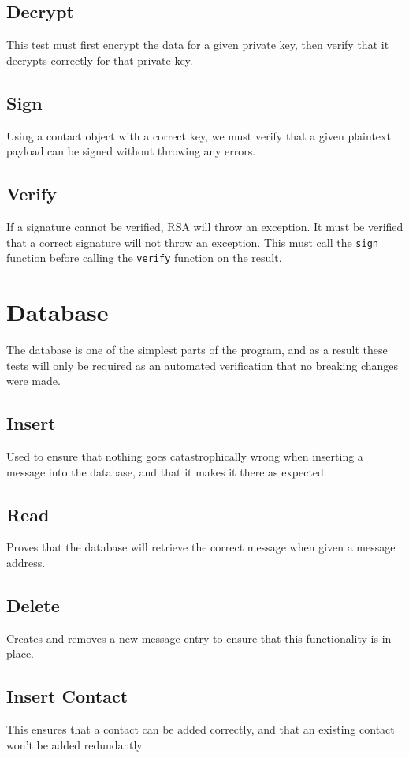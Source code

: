 \documentclass[titlepage]{report}
\begin{document}
\subsection{Decrypt}
This test must first encrypt the data for a given \gls{private key}, then verify that it decrypts correctly for that \gls{private key}.
\subsection{Sign}
Using a contact object with a correct key, we must verify that a given plaintext payload can be signed without throwing any errors.
\subsection{Verify}
If a signature cannot be verified, RSA will throw an exception. It must be verified that a correct signature will not throw an exception. This must call the \texttt{sign} function before calling the \texttt{verify} function on the result.

\section{Database}
The database is one of the simplest parts of the program, and as a result these tests will only be required as an automated verification that no breaking changes were made.
\subsection{Insert}
Used to ensure that nothing goes catastrophically wrong when inserting a message into the database, and that it makes it there as expected.
\subsection{Read}
Proves that the database will retrieve the correct message when given a message address.
\subsection{Delete}
Creates and removes a new message entry to ensure that this functionality is in place.
\subsection{Insert Contact}
This ensures that a contact can be added correctly, and that an existing contact won't be added redundantly.
\end{document}
